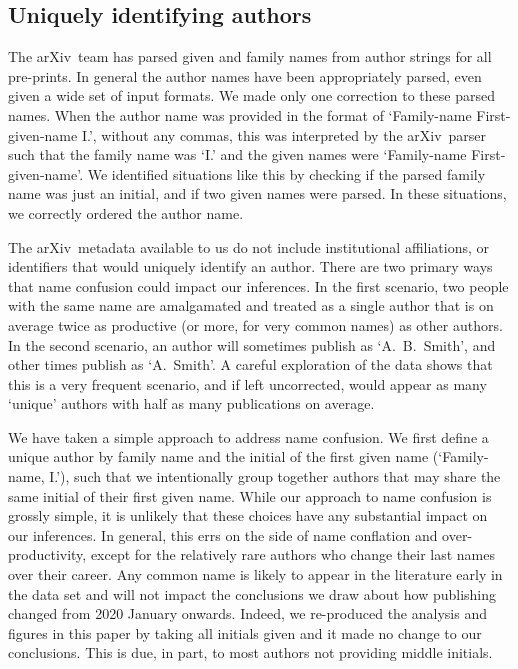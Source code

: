 \documentclass[]{rsos}%
\newcommand{\arxiv}{arXiv}
\begin{document}
\subsection*{Uniquely identifying authors}

The \arxiv\ team has parsed given and family names from author strings for all pre-prints. In general the author names have been appropriately parsed, even given a wide set of input formats. We made only one correction to these parsed names. When the author name was provided in the format of `Family-name First-given-name I.', without any commas, this was interpreted by the \arxiv\ parser such that the family name was `I.' and the given names were `Family-name First-given-name'. We identified situations like this by checking if the parsed family name was just an initial, and if two given names were parsed. In these situations, we correctly ordered the author name.

The \arxiv\ metadata available to us do not include institutional affiliations, or identifiers that would uniquely identify an author. 
There are two primary ways that name confusion could impact our inferences. In the first scenario, two people with the same name are amalgamated and treated as a single author that is on average twice as productive (or more, for very common names) as other authors. In the second scenario, an author will sometimes publish as `A.~B.~Smith', and other times publish as `A.~Smith'. A careful exploration of the data shows that this is a very frequent scenario, and if left uncorrected, would appear as many `unique' authors with half as many publications on average.

We have taken a simple approach to address name confusion. We first define a unique author by family name and the initial of the first given name (`Family-name, I.'), such that we intentionally group together authors that may share the same initial of their first given name. 
While our approach to name confusion is grossly simple, it is unlikely that these choices have any substantial impact on our inferences. In general, this errs on the side of name conflation and over-productivity, except for the relatively rare authors who change their last names over their career.
Any common name is likely to appear in the literature early in the data set and will not impact the conclusions we draw about how publishing changed from 2020 January onwards. Indeed, we re-produced the analysis and figures in this paper by taking all initials given and it made no change to our conclusions. This is due, in part, to most authors not providing middle initials.
\end{document}
